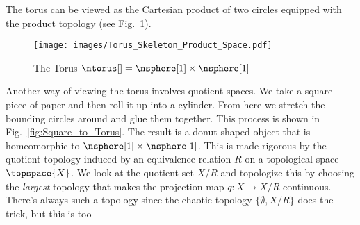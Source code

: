\documentclass{book}                                                           %
\begin{document}
                \hfill
                \par
                \begin{example}
                    The torus can be viewed as the Cartesian product of two
                    circles equipped with the product topology
                    (see Fig.~\ref{fig:Torus_as_Prod_Space}).
                \end{example}
                \begin{figure}[H]
                    \centering
                    \captionsetup{type=figure}
                    \texttt{[image: images/Torus\_Skeleton\_Product\_Space.pdf]}
                    \caption{The Torus $\ntorus[]=\nsphere[1]\times\nsphere[1]$}
                    \label{fig:Torus_as_Prod_Space}
                \end{figure}
                Another way of viewing the torus involves quotient spaces. We
                take a square piece of paper and then roll it up into a
                cylinder. From here we stretch the bounding circles around and
                glue them together. This process is shown in
                Fig.~\ref{fig:Square_to_Torus}. The result is a donut shaped
                object that is homeomorphic to $\nsphere[1]\times\nsphere[1]$.
                This is made rigorous by the quotient topology induced by an
                equivalence relation $R$ on a topological space
                $\topspace{X}$. We look at the quotient
                set $X/R$ and topologize this by choosing the \textit{largest}
                topology that makes the projection map $q:X\rightarrow{X}/R$
                continuous. There's always such a topology since the chaotic
                topology $\{\emptyset,X/R\}$ does the trick, but this is too
\end{document}
